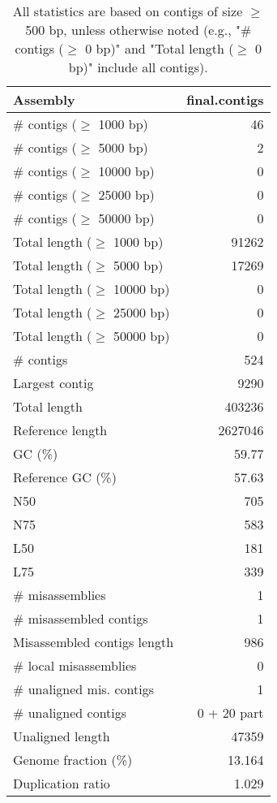 \documentclass[12pt,a4paper]{article}
\begin{document}
\begin{table}[ht]
\begin{center}
\caption{All statistics are based on contigs of size $\geq$ 500 bp, unless otherwise noted (e.g., "\# contigs ($\geq$ 0 bp)" and "Total length ($\geq$ 0 bp)" include all contigs).}
\begin{tabular}{|l*{1}{|r}|}
\hline
Assembly & final.contigs \\ \hline
\# contigs ($\geq$ 1000 bp) & 46 \\ \hline
\# contigs ($\geq$ 5000 bp) & 2 \\ \hline
\# contigs ($\geq$ 10000 bp) & 0 \\ \hline
\# contigs ($\geq$ 25000 bp) & 0 \\ \hline
\# contigs ($\geq$ 50000 bp) & 0 \\ \hline
Total length ($\geq$ 1000 bp) & 91262 \\ \hline
Total length ($\geq$ 5000 bp) & 17269 \\ \hline
Total length ($\geq$ 10000 bp) & 0 \\ \hline
Total length ($\geq$ 25000 bp) & 0 \\ \hline
Total length ($\geq$ 50000 bp) & 0 \\ \hline
\# contigs & 524 \\ \hline
Largest contig & 9290 \\ \hline
Total length & 403236 \\ \hline
Reference length & 2627046 \\ \hline
GC (\%) & 59.77 \\ \hline
Reference GC (\%) & 57.63 \\ \hline
N50 & 705 \\ \hline
N75 & 583 \\ \hline
L50 & 181 \\ \hline
L75 & 339 \\ \hline
\# misassemblies & 1 \\ \hline
\# misassembled contigs & 1 \\ \hline
Misassembled contigs length & 986 \\ \hline
\# local misassemblies & 0 \\ \hline
\# unaligned mis. contigs & 1 \\ \hline
\# unaligned contigs & 0 + 20 part \\ \hline
Unaligned length & 47359 \\ \hline
Genome fraction (\%) & 13.164 \\ \hline
Duplication ratio & 1.029 \\ \hline

\end{tabular}
\end{center}
\end{table}
\end{document}
